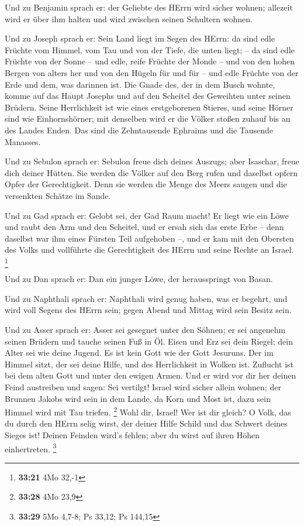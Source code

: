  Und zu Benjamin sprach er: der Geliebte des HErrn wird
sicher wohnen; allezeit wird er über ihm halten und wird zwischen seinen
Schultern wohnen.

 Und zu Joseph sprach er: Sein Land liegt im Segen des
HErrn: da sind edle Früchte vom Himmel, vom Tau und von der Tiefe, die
unten liegt; --  da sind edle Früchte von der Sonne -- und
edle, reife Früchte der Monde --  und von den hohen Bergen
von alters her und von den Hügeln für und für --  und edle
Früchte von der Erde und dem, was darinnen ist. Die Gnade des, der in
dem Busch wohnte, komme auf das Haupt Josephs und auf den Scheitel des
Geweihten unter seinen Brüdern.  Seine Herrlichkeit ist wie
eines erstgeborenen Stieres, und seine Hörner sind wie Einhornshörner;
mit denselben wird er die Völker stoßen zuhauf bis an des Landes Enden.
Das sind die Zehntausende Ephraims und die Tausende Manasses.

 Und zu Sebulon sprach er: Sebulon freue dich deines
Auszugs; aber Isaschar, freue dich deiner Hütten.  Sie
werden die Völker auf den Berg rufen und daselbst opfern Opfer der
Gerechtigkeit. Denn sie werden die Menge des Meers saugen und die
versenkten Schätze im Sande.

 Und zu Gad sprach er: Gelobt sei, der Gad Raum macht! Er
liegt wie ein Löwe und raubt den Arm und den Scheitel,  und
er ersah sich das erste Erbe -- denn daselbst war ihm eines Fürsten Teil
aufgehoben --, und er kam mit den Obersten des Volks und vollführte die
Gerechtigkeit des HErrn und seine Rechte an Israel. \footnote{\textbf{33:21}
  4Mo 32,-1}

 Und zu Dan sprach er: Dan ein junger Löwe, der
herausspringt von Basan.

 Und zu Naphthali sprach er: Naphthali wird genug haben,
was er begehrt, und wird voll Segens des HErrn sein; gegen Abend und
Mittag wird sein Besitz sein.

 Und zu Asser sprach er: Asser sei gesegnet unter den
Söhnen; er sei angenehm seinen Brüdern und tauche seinen Fuß in Öl.
 Eisen und Erz sei dein Riegel; dein Alter sei wie deine
Jugend.  Es ist kein Gott wie der Gott Jesuruns. Der im
Himmel sitzt, der sei deine Hilfe, und des Herrlichkeit in Wolken ist.
 Zuflucht ist bei dem alten Gott und unter den ewigen
Armen. Und er wird vor dir her deinen Feind austreiben und sagen: Sei
vertilgt!  Israel wird sicher allein wohnen; der Brunnen
Jakobs wird sein in dem Lande, da Korn und Most ist, dazu sein Himmel
wird mit Tau triefen. \footnote{\textbf{33:28} 4Mo 23,9} 
Wohl dir, Israel! Wer ist dir gleich? O Volk, das du durch den HErrn
selig wirst, der deiner Hilfe Schild und das Schwert deines Sieges ist!
Deinen Feinden wird's fehlen; aber du wirst auf ihren Höhen
einhertreten. \footnote{\textbf{33:29} 5Mo 4,7-8; Ps 33,12; Ps 144,15}

